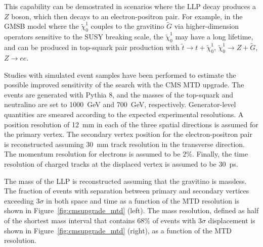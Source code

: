 This capability can be demostrated in scenarios where the LLP decay produces a $Z$ boson, which then decays to an electron-positron pair. For example, in the GMSB model where the $\tilde{\chi}_0^1$ couples to the gravitino $\tilde{G}$ via higher-dimension operators sensitive to the SUSY breaking scale, the $\tilde{\chi}_0^1$ may have a long lifetime, and can be produced in top-squark pair production with $\tilde{t}\to t+\tilde{\chi}_0^1$, $\tilde{\chi}_0^1 \to Z+\tilde{G}$, $Z\to ee$.

Studies with simulated event samples have been performed to estimate the possible improved sensitivity of the search with the CMS MTD upgrade. The events are generated with Pythia 8, and the masses of the top-squark and neutralino are set to 1000~GeV and 700~GeV, respectively. Generator-level quantities are smeared according to the expected experimental resolutions. A position resolution of 12~mm in each of the three spatial directions is assumed for the primary vertex. The secondary vertex position for the electron-positron pair is reconstructed assuming 30~mm track resolution in the transverse direction. The momentum resolution for electrons is assumed to be $2\%$. Finally, the time resolution of charged tracks at the displaced vertex is assumed to be 30~ps.

The mass of the LLP is reconstructed assuming that the gravitino is massless. The fraction of events with separation between primary and secondary vertices exceeding 3$\sigma$ in both space and time as a function of the MTD resolution is shown in Figure~\ref{fig:cmsupgrade_mtd} (left). The mass resolution, defined as half of the shortest mass interval that contains $68\%$ of events with 3$\sigma$ displacement is shown in Figure~\ref{fig:cmsupgrade_mtd} (right), as a function of the MTD resolution. 

